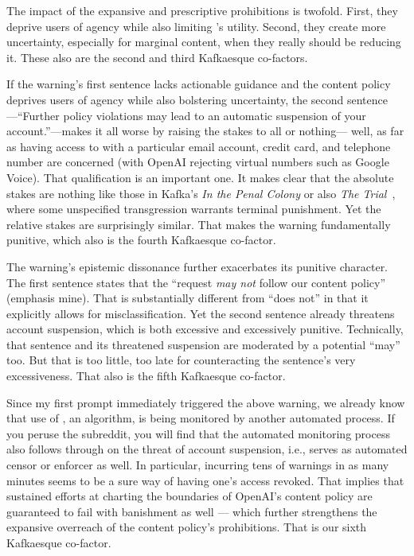 The impact of the expansive and prescriptive prohibitions is twofold. First,
they deprive users of agency while also limiting \DALLE's utility. Second, they
create more uncertainty, especially for marginal content, when they really
should be reducing it. These also are the second and third Kafkaesque
co-factors.

If the warning's first sentence lacks actionable guidance and the content policy
deprives users of agency while also bolstering uncertainty, the second sentence%
---``Further policy violations may lead to an automatic suspension of your
account.''---makes it all worse by raising the stakes to all or nothing---%
well, as far as having access to \DALLE{} with a particular email account,
credit card, and telephone number are concerned (with OpenAI rejecting virtual
numbers such as Google Voice). That qualification is an important one. It makes
clear that the absolute stakes are nothing like those in Kafka's \emph{In the
Penal Colony} or also \emph{The Trial}~\cite{Kafka2005}, where some unspecified
transgression warrants terminal punishment. Yet the relative stakes are
surprisingly similar. That makes the warning fundamentally punitive, which also
is the fourth Kafkaesque co-factor.

The warning's epistemic dissonance further exacerbates its punitive character.
The first sentence states that the ``request \emph{may not} follow our content
policy'' (emphasis mine). That is substantially different from ``does not'' in
that it explicitly allows for misclassification. Yet the second sentence already
threatens account suspension, which is both excessive and excessively punitive.
Technically, that sentence and its threatened suspension are moderated by a
potential ``may'' too. But that is too little, too late for counteracting the
sentence's very excessiveness. That also is the fifth Kafkaesque co-factor.

Since my first prompt immediately triggered the above warning, we already know
that use of \DALLE, an algorithm, is being monitored by another automated
process. If you peruse the \DALLE{} subreddit, you will find that the automated
monitoring process also follows through on the threat of account suspension,
i.e., serves as automated censor or enforcer as well. In particular, incurring
tens of warnings in as many minutes seems to be a sure way of having one's
access revoked. That implies that sustained efforts at charting the boundaries
of OpenAI's content policy are guaranteed to fail with banishment as well —
which further strengthens the expansive overreach of the content policy's
prohibitions. That is our sixth Kafkaesque co-factor.

